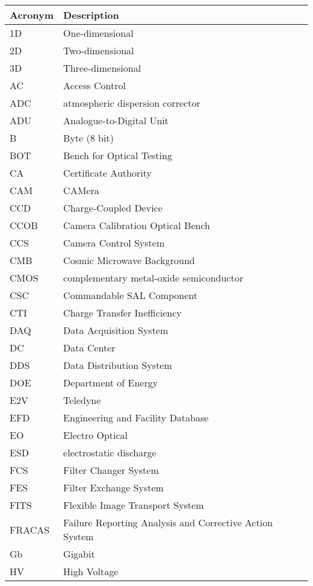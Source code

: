 \addtocounter{table}{-1}
\begin{longtable}{p{}p{}}\hline
\textbf{Acronym} & \textbf{Description}  \\\hline

1D & One-dimensional \\\hline
2D & Two-dimensional \\\hline
3D & Three-dimensional \\\hline
AC & Access Control \\\hline
ADC & atmospheric dispersion corrector \\\hline
ADU & Analogue-to-Digital Unit \\\hline
B & Byte (8 bit) \\\hline
BOT & Bench for Optical Testing \\\hline
CA & Certificate Authority \\\hline
CAM & CAMera \\\hline
CCD & Charge-Coupled Device \\\hline
CCOB & Camera Calibration Optical Bench \\\hline
CCS & Camera Control System \\\hline
CMB & Cosmic Microwave Background \\\hline
CMOS & complementary metal-oxide semiconductor \\\hline
CSC & Commandable SAL Component \\\hline
CTI & Charge Transfer Inefficiency \\\hline
DAQ & Data Acquisition System \\\hline
DC & Data Center \\\hline
DDS & Data Distribution System \\\hline
DOE & Department of Energy \\\hline
E2V & Teledyne \\\hline
EFD & Engineering and Facility Database \\\hline
EO & Electro Optical \\\hline
ESD & electrostatic discharge \\\hline
FCS & Filter Changer System \\\hline
FES & Filter Exchange System \\\hline
FITS & Flexible Image Transport System \\\hline
FRACAS & Failure Reporting Analysis and Corrective Action System \\\hline
Gb & Gigabit \\\hline
HV & High Voltage \\\hline

\end{longtable}
